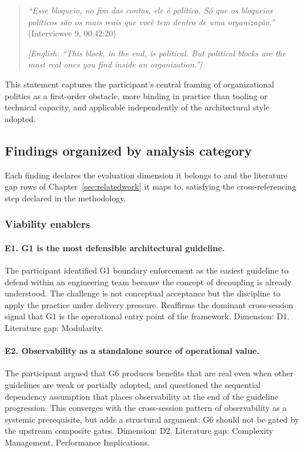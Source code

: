 \begin{quote}
\emph{``Esse bloqueio, no fim das contas, ele é político. Só que os bloqueios políticos são os mais reais que você tem dentro de uma organização.''} (Interviewee 9, 00:42:20)

\medskip

\emph{[English: ``This block, in the end, is political. But political blocks are the most real ones you find inside an organization.'']}
\end{quote}

This statement captures the participant's central framing of organizational politics as a first-order obstacle, more binding in practice than tooling or technical capacity, and applicable independently of the architectural style adopted.

\subsection*{Findings organized by analysis category}

Each finding declares the evaluation dimension it belongs to and the literature gap rows of Chapter~\ref{sec:relatedwork} it maps to, satisfying the cross-referencing step declared in the methodology.

\subsubsection*{Viability enablers}

\paragraph*{E1. G1 is the most defensible architectural guideline.} The participant identified G1 boundary enforcement as the easiest guideline to defend within an engineering team because the concept of decoupling is already understood. The challenge is not conceptual acceptance but the discipline to apply the practice under delivery pressure. Reaffirms the dominant cross-session signal that G1 is the operational entry point of the framework. Dimension: D1. Literature gap: Modularity.

\paragraph*{E2. Observability as a standalone source of operational value.} The participant argued that G6 produces benefits that are real even when other guidelines are weak or partially adopted, and questioned the sequential dependency assumption that places observability at the end of the guideline progression. This converges with the cross-session pattern of observability as a systemic prerequisite, but adds a structural argument: G6 should not be gated by the upstream composite gates. Dimension: D2. Literature gap: Complexity Management, Performance Implications.

